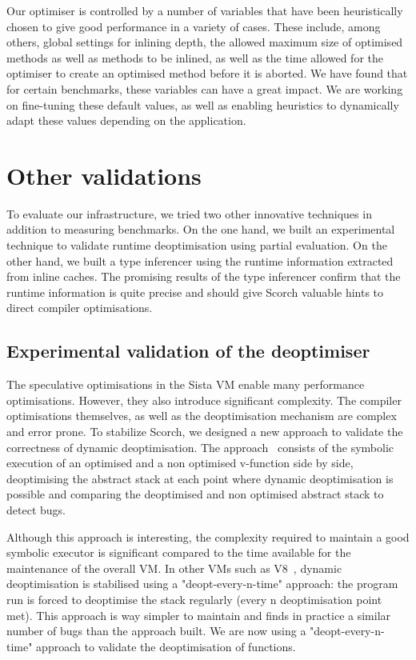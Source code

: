 \documentclass[a4paper,12pt,twoside]{../includes/ThesisStyle}
\begin{document}
	Our optimiser is controlled by a number of variables that have been heuristically chosen to give good performance in a variety of cases. These include, among others, global settings for inlining depth, the allowed maximum size of optimised methods as well as methods to be inlined, as well as the time allowed for the optimiser to create an optimised method before it is aborted. We have found that for certain benchmarks, these variables can have a great impact. We are working on fine-tuning these default values, as well as enabling heuristics to dynamically adapt these values depending on the application.
	
\section{Other validations}
\label{sec:otherValid}

To evaluate our infrastructure, we tried two other innovative techniques in addition to measuring benchmarks. On the one hand, we built an experimental technique to validate runtime deoptimisation using partial evaluation. On the other hand, we built a type inferencer using the runtime information extracted from inline caches. The promising results of the type inferencer confirm that the runtime information is quite precise and should give Scorch valuable hints to direct compiler optimisations.

\subsection{Experimental validation of the deoptimiser}

The speculative optimisations in the Sista VM enable many performance optimisations. However, they also introduce significant complexity. The compiler optimisations themselves, as well as the deoptimisation mechanism are complex and error prone. To stabilize Scorch, we designed a new approach to validate the correctness of dynamic deoptimisation. The approach~\cite{Bera16a} consists of the symbolic execution of an optimised and a non optimised v-function side by side, deoptimising the abstract stack at each point where dynamic deoptimisation is possible and comparing the deoptimised and non optimised abstract stack to detect bugs. 

Although this approach is interesting, the complexity required to maintain a good symbolic executor is significant compared to the time available for the maintenance of the overall VM. In other VMs such as V8~\cite{V8}, dynamic deoptimisation is stabilised using a "deopt-every-n-time" approach: the program run is forced to deoptimise the stack regularly (every n deoptimisation point met). This approach is way simpler to maintain and finds in practice a similar number of bugs than the approach built. We are now using a "deopt-every-n-time" approach to validate the deoptimisation of functions.
\end{document}
